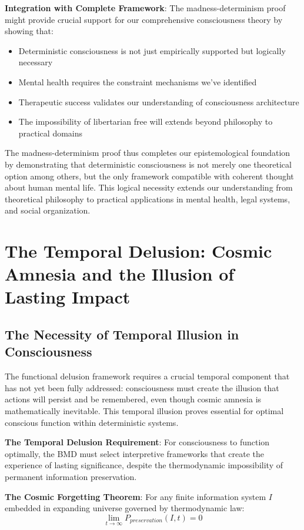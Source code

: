 \documentclass[12pt]{article}
\begin{document}
\textbf{Integration with Complete Framework}: The madness-determinism proof might provide crucial support for our comprehensive consciousness theory by showing that:
\begin{itemize}
\item Deterministic consciousness is not just empirically supported but logically necessary
\item Mental health requires the constraint mechanisms we've identified
\item Therapeutic success validates our understanding of consciousness architecture
\item The impossibility of libertarian free will extends beyond philosophy to practical domains
\end{itemize}

The madness-determinism proof thus completes our epistemological foundation by demonstrating that deterministic consciousness is not merely one theoretical option among others, but the only framework compatible with coherent thought about human mental life. This logical necessity extends our understanding from theoretical philosophy to practical applications in mental health, legal systems, and social organization.

\section{The Temporal Delusion: Cosmic Amnesia and the Illusion of Lasting Impact}

\subsection{The Necessity of Temporal Illusion in Consciousness}

The functional delusion framework requires a crucial temporal component that has not yet been fully addressed: consciousness must create the illusion that actions will persist and be remembered, even though cosmic amnesia is mathematically inevitable. This temporal illusion proves essential for optimal conscious function within deterministic systems.

\textbf{The Temporal Delusion Requirement}: For consciousness to function optimally, the BMD must select interpretive frameworks that create the experience of lasting significance, despite the thermodynamic impossibility of permanent information preservation.

\textbf{The Cosmic Forgetting Theorem}: For any finite information system $I$ embedded in expanding universe governed by thermodynamic law:
$$\lim_{t \to \infty} P_{preservation}(I,t) = 0$$
\end{document}
